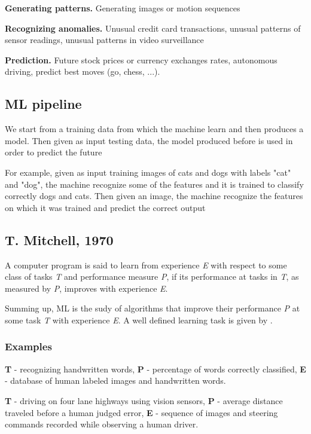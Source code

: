 \documentclass{article}
\begin{document}
\textbf{Generating patterns. } Generating images or motion sequences

\textbf{Recognizing anomalies. } Unusual credit card transactions, unusual patterns of sensor readings, unusual patterns in video surveillance

\textbf{Prediction. } Future stock prices or currency exchanges rates, autonomous driving, predict best moves (go, chess, ...).


\bigskip


\subsection*{ML pipeline}
We start from a training data from which the machine learn and then produces a model. Then given as input testing data, the model produced before is used in order to predict the future

For example, given as input training images of cats and dogs with labels "cat" and "dog", the machine recognize some of the features and it is trained to classify correctly dogs and cats. Then given an image, the machine recognize the features on which it was trained and predict the correct output
	
	
\subsection*{T. Mitchell, 1970}

A computer program is said to learn from experience \emph{E} with respect to some class of tasks \emph{T} and performance measure \emph{P}, if its performance at tasks in \emph{T}, as measured by \emph{P}, improves with experience \emph{E}.

Summing up, ML is the sudy of algorithms that improve their performance \emph{P} at some task \emph{T} with experience \emph{E}. A well defined learning task is given by \(< T, P, E >\).

\subsubsection*{Examples}

\textbf{T} - recognizing handwritten words, \textbf{P} - percentage of words correctly classified, \textbf{E} - database of human labeled images and handwritten words.

\textbf{T} - driving on four lane highways using vision sensors, \textbf{P} - average distance traveled before a human judged error, \textbf{E} - sequence of images and steering commands recorded while observing a human driver.
\end{document}
